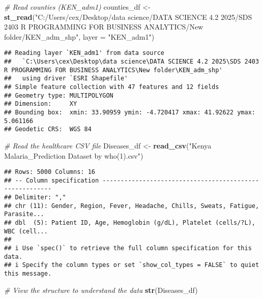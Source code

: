 \documentclass[
]{article}
\newenvironment{Shaded}{\begin{snugshade}}{\end{snugshade}}
\newcommand{\AttributeTok}[1]{\textcolor[rgb]{0.13,0.29,0.53}{#1}}
\newcommand{\CommentTok}[1]{\textcolor[rgb]{0.56,0.35,0.01}{\textit{#1}}}
\newcommand{\FunctionTok}[1]{\textcolor[rgb]{0.13,0.29,0.53}{\textbf{#1}}}
\newcommand{\NormalTok}[1]{#1}
\newcommand{\OtherTok}[1]{\textcolor[rgb]{0.56,0.35,0.01}{#1}}
\newcommand{\StringTok}[1]{\textcolor[rgb]{0.31,0.60,0.02}{#1}}
\begin{document}
\begin{Shaded}
\begin{Highlighting}[]
\CommentTok{\# Read counties (KEN\_adm1)}
\NormalTok{counties\_df }\OtherTok{\textless{}{-}} \FunctionTok{st\_read}\NormalTok{(}\StringTok{"C:/Users/cex/Desktop/data science/DATA SCIENCE 4.2 2025/SDS 2403 R PROGRAMMING FOR BUSINESS ANALYTICS/New folder/KEN\_adm\_shp"}\NormalTok{, }
                          \AttributeTok{layer =} \StringTok{"KEN\_adm1"}\NormalTok{)}
\end{Highlighting}
\end{Shaded}

\begin{verbatim}
## Reading layer `KEN_adm1' from data source 
##   `C:\Users\cex\Desktop\data science\DATA SCIENCE 4.2 2025\SDS 2403 R PROGRAMMING FOR BUSINESS ANALYTICS\New folder\KEN_adm_shp' 
##   using driver `ESRI Shapefile'
## Simple feature collection with 47 features and 12 fields
## Geometry type: MULTIPOLYGON
## Dimension:     XY
## Bounding box:  xmin: 33.90959 ymin: -4.720417 xmax: 41.92622 ymax: 5.061166
## Geodetic CRS:  WGS 84
\end{verbatim}

\begin{Shaded}
\begin{Highlighting}[]
\CommentTok{\# Read the healthcare CSV file}
\NormalTok{Diseases\_df }\OtherTok{\textless{}{-}} \FunctionTok{read\_csv}\NormalTok{(}\StringTok{"Kenya Malaria\_Prediction Dataset by who(1).csv"}\NormalTok{)}
\end{Highlighting}
\end{Shaded}

\begin{verbatim}
## Rows: 5000 Columns: 16
## -- Column specification --------------------------------------------------------
## Delimiter: ","
## chr (11): Gender, Region, Fever, Headache, Chills, Sweats, Fatigue, Parasite...
## dbl  (5): Patient ID, Age, Hemoglobin (g/dL), Platelet (cells/?L), WBC (cell...
## 
## i Use `spec()` to retrieve the full column specification for this data.
## i Specify the column types or set `show_col_types = FALSE` to quiet this message.
\end{verbatim}

\begin{Shaded}
\begin{Highlighting}[]
\CommentTok{\# View the structure to understand the data}
\FunctionTok{str}\NormalTok{(Diseases\_df)}
\end{Highlighting}
\end{Shaded}
\end{document}
